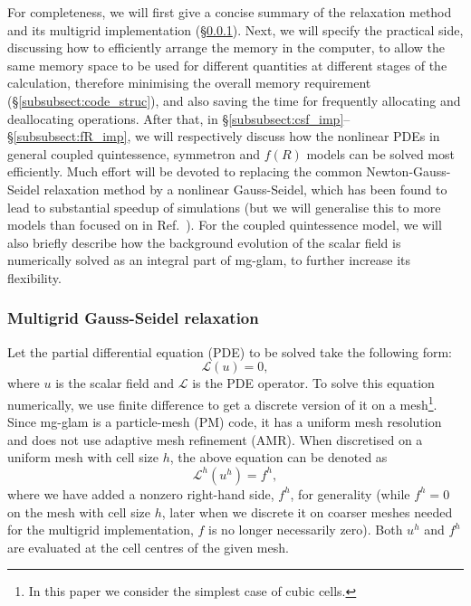 For completeness, we will first give a concise summary of the relaxation method and its multigrid implementation (\S\ref{subsubsect:relaxation}). Next, we will specify the practical side, discussing how to efficiently arrange the memory in the computer, to allow the same memory space to be used for different quantities at different stages of the calculation, therefore minimising the overall memory requirement (\S\ref{subsubsect:code_struc}), and also saving the time for frequently allocating and deallocating operations. 
After that, in \S\ref{subsubsect:csf_imp}--\S\ref{subsubsect:fR_imp}, we will respectively discuss how the nonlinear PDEs in general coupled quintessence, symmetron and $f(R)$ models can be solved most efficiently. Much effort will be devoted to replacing the common Newton-Gauss-Seidel relaxation method by a nonlinear Gauss-Seidel, which has been found to lead to substantial speedup of simulations \cite{Bose:2016wms} (but we will generalise this to more models than focused on in Ref.~\cite{Bose:2016wms}). For the coupled quintessence model, we will also briefly describe how the background evolution of the scalar field is numerically solved as an integral part of {\sc mg}-{\sc glam}, to further increase its flexibility. 

\subsubsection{Multigrid Gauss-Seidel relaxation}
\label{subsubsect:relaxation}

Let the partial differential equation (PDE) to be solved take the following form:
\begin{equation}
    \mathcal{L}(u) = 0,
\end{equation}
where $u$ is the scalar field and $\mathcal{L}$ is the PDE operator. To solve this equation numerically, we use finite difference to get a discrete version of it on a mesh\footnote{In this paper we consider the simplest case of cubic cells.}. Since {\sc mg}-{\sc glam} is a particle-mesh (PM) code, it has a uniform mesh resolution and does not use adaptive mesh refinement (AMR). When discretised on a uniform mesh with cell size $h$, the above equation can be denoted as
\begin{equation}\label{eq:general_pde}
    \mathcal{L}^h({u}^h) = {f}^h,
\end{equation}
where we have added a nonzero right-hand side, $f^h$, for generality (while $f^h=0$ on the mesh with cell size $h$, later when we discrete it on coarser meshes needed for the multigrid implementation, $f$ is no longer necessarily zero). Both $u^h$ and $f^h$ are evaluated at the cell centres of the given mesh.

